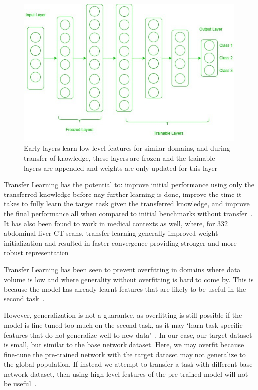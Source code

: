 \documentclass[11pt,twoside]{report}
\begin{document}
\begin{figure}[H]
  \centering
  \includegraphics[width=0.7\linewidth]{../figures/Frozen-layers.jpg}
  \caption{Early layers learn low-level features for similar domains, and during transfer of knowledge, these layers are frozen and the trainable layers are appended and weights are only updated for this layer~\cite{geeks-transfer-learning}}
 \label{fig:frozen-layers}
\end{figure}

Transfer Learning has the potential to: improve initial performance using only the transferred knowledge before nay further learning is done, improve the time it takes to fully learn the target task given the transferred knowledge, and improve the final performance all when compared to initial benchmarks without transfer~\cite{torrey-handbook}. It has also been found to work in medical contexts as well, where, for 332 abdominal liver CT scans, transfer learning generally improved weight initialization and resulted in faster convergence providing stronger and more robust representation~\cite{liver-lesion-via-transfer-learning}

Transfer Learning has been seen to prevent overfitting in domains where data volume is low and where generality without overfitting is hard to come by. This is because the model has already learnt features that are likely to be useful in the second task~\cite{geeks-transfer-learning}. 

However, generalization is not a guarantee, as overfitting is still possible if the model is fine-tuned too much on the second task, as it may `learn task-specific features that do not generalize well to new data'~\cite{geeks-transfer-learning}. In our case, our target dataset is small, but similar to the base network dataset. Here, we may overfit because fine-tune the pre-trained network with the target dataset may not generalize to the global population. If instead we attempt to transfer a task with different base network dataset, then using high-level features of the pre-trained model will not be useful~\cite{geeks-transfer-learning}.
\end{document}
